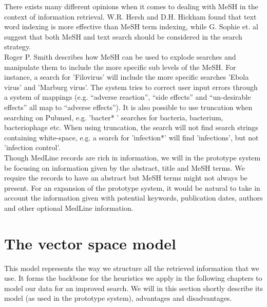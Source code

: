 There exists many different opinions when it comes to dealing with
MeSH in the context of information retrieval. W.R. Hersh and
D.H. Hickham \cite{RetrievalEffectiveness} found that text word
indexing is more effective than MeSH term indexing, while G. Sophie
et. al \cite{FDGPET} suggest that both MeSH and text search should be
considered in the search strategy.\\

Roger P. Smith \cite{TheInternetforPhysicians} describes how MeSH can be used to
explode searches and manipulate them to include the more specific sub
levels of the MeSH. For instance, a search for 'Filovirus' will
include the more specific searches 'Ebola virus' and 'Marburg
virus'. The system tries to correct user input errors through a system
of mappings (e.g. ``adverse reaction'', ``side effects'' and
``un-desirable effects'' all map to ``adverse effects''). It is also
possible to use truncation when searching on Pubmed, e.g. 'bacter* '
searches for bacteria, bacterium, bacteriophage etc. When using
truncation, the search will not find search strings containing
white-space, e.g. a search for 'infection*' will find 'infections',
but not 'infection control'.\\

Though MedLine records are rich in information, we will in the
prototype system be focusing on information given by the abstract,
title and MeSH terms. We require the records to have an abstract but
MeSH terms might not always be present. For an expansion of the
prototype system, it would be natural to take in account the
information given with potential keywords, publication dates, authors
and other optional MedLine information. 


\section{The vector space model\label{VectorSpace}}

This model represents the way we structure all the retrieved
information that we use. It forms the backbone for the heuristics we
apply in the following chapters to model our data for an improved
search. We will in this section shortly describe its model (as used in
the prototype system), advantages and disadvantages.\\

